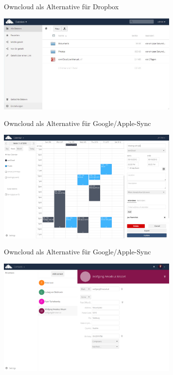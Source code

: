 \documentclass[12pt]{beamer}
\begin{document}
\begin{frame}{Owncloud als Alternative für Dropbox}
  \begin{center}
    \includegraphics[width=9cm]{img/owncloud-screenshot.jpg}
  \end{center}
\end{frame}

\begin{frame}{Owncloud als Alternative für Google/Apple-Sync}
  \begin{center}
    \includegraphics[width=9cm]{img/owncloud-calendar.png}
  \end{center}
\end{frame}

\begin{frame}{Owncloud als Alternative für Google/Apple-Sync}
  \begin{center}
    \includegraphics[width=9cm]{img/owncloud-contacts.png}
  \end{center}
\end{frame}
\end{document}
